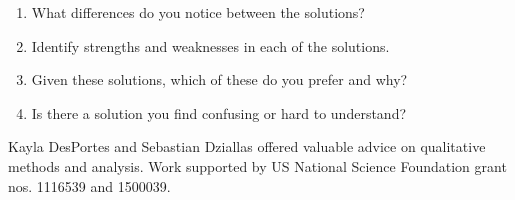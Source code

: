 \begin{enumerate}[leftmargin=*]

\item What differences do you notice between the solutions?
\item Identify strengths and weaknesses in each of the solutions.
\item Given these solutions, which of these do you prefer and why?
\item Is there a solution you find confusing or hard to understand?

\end{enumerate}


\begin{acks}
Kayla DesPortes and Sebastian Dziallas offered valuable advice on qualitative
methods and analysis. Work supported by US National Science Foundation grant
nos. 1116539 and 1500039.
\end{acks}
